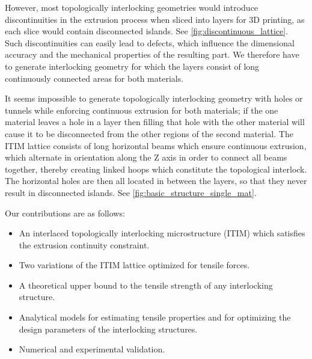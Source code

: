 However, most topologically interlocking geometries would introduce discontinuities in the extrusion process when sliced into layers for 3D printing, as each slice would contain disconnected islands.
See \cref{fig:discontinuous_lattice}.
Such discontinuities can easily lead to defects, which influence the dimensional accuracy and the mechanical properties of the resulting part.
We therefore have to generate interlocking geometry for which the layers consist of long continuously connected areas for both materials.

It seems impossible to generate topologically interlocking geometry with holes or tunnels while enforcing continuous extrusion for both materials;
if the one material leaves a hole in a layer then filling that hole with the other material will cause it to be disconnected from the other regions of the second material.
The ITIM lattice consists of long horizontal beams which ensure continuous extrusion, which alternate in orientation along the Z axis in order to connect all beams together, thereby creating linked hoops which constitute the topological interlock.
The horizontal holes are then all located in between the layers, so that they never result in disconnected islands.
See \cref{fig:basic_structure_single_mat}.


Our contributions are as follows:
\begin{itemize}
	\item An interlaced topologically interlocking microstructure (ITIM) which satisfies the extrusion continuity constraint.
	\item Two variations of the ITIM lattice optimized for tensile forces.
	\item A theoretical upper bound to the tensile strength of any interlocking structure.
	\item Analytical models for estimating tensile properties and for optimizing the design parameters of the interlocking structures.
	\item Numerical and experimental validation.
\end{itemize}






